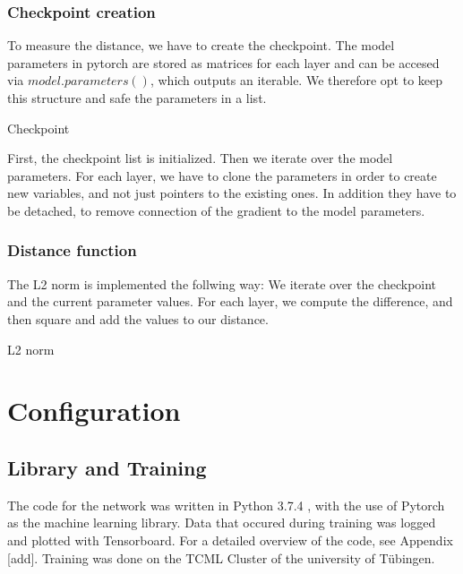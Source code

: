\subsubsection{Checkpoint creation}
To measure the distance, we have to create the checkpoint. The model parameters
in pytorch are stored as matrices for each layer and can be accesed via
$model.parameters()$, which outputs an iterable. We therefore opt to keep this
structure and safe the parameters in a list.
\begin{algorithm}[h!]
    \caption{Checkpoint}\label{alg:Checkpoint}
    \lstset{language=Python}
    
\end{algorithm}
\newline
First, the checkpoint list is initialized. Then we iterate over the model
parameters. For each layer, we have to clone the parameters in order to create
new variables, and not just pointers to the existing ones. In addition they have
to be detached, to remove connection of the gradient to the model parameters.

\subsubsection{Distance function}
The L2 norm is implemented the follwing way: We iterate over the checkpoint and
the current parameter values. For each layer, we compute the difference, and
then square and add the values to our distance.
\begin{algorithm}[h!]
    \caption{L2 norm}\label{alg:L2Norm}
    \lstset{language=Python}
    
\end{algorithm}



\section{Configuration}

\subsection{Library and Training}
The code for the network was written in Python 3.7.4 , with the use of
Pytorch \cite{NEURIPS2019_9015} as the machine learning library. Data that occured during training was
logged and plotted with Tensorboard. For a detailed overview of the code, see
Appendix [add]. Training was done on the TCML Cluster of the university of Tübingen.

